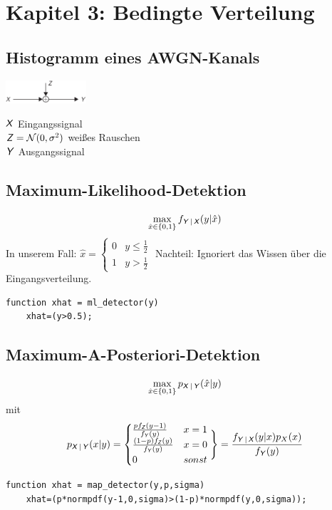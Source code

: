\documentclass[deutsch]{latex4ei/latex4ei_sheet}
\begin{document}
\section{Kapitel 3: Bedingte Verteilung}
\begin{sectionbox}
	\subsection{Histogramm eines AWGN-Kanals}
	\parbox{3.3cm}{
	\includegraphics[width = 3cm]{img/awgn-channel.png}
	}
	\parbox{4cm}{
		$\operatorname{\textsf{\textit{X}}}$ Eingangssignal\\
		$\operatorname{\textsf{\textit{Z}}} = \mathcal N(0, \sigma^2)$ weißes Rauschen\\
		$\operatorname{\textsf{\textit{Y}}}$ Ausgangssignal
		}
	
\end{sectionbox}

\begin{sectionbox}
	\subsection{Maximum-Likelihood-Detektion}
	\[ \max_{\hat x \in \{0,1\}}f_{\operatorname{\textsf{\textit{Y}}}|\operatorname{\textsf{\textit{X}}}}(y|\hat x) \]
	In unserem Fall: $\hat x = \begin{cases}
	0 & y\le \frac{1}{2}\\
	1 & y > \frac{1}{2}
	\end{cases}$
	Nachteil: Ignoriert das Wissen über die Eingangsverteilung.\\
	\begin{lstlisting}[gobble=4]
	function xhat = ml_detector(y)
	xhat=(y>0.5);
	\end{lstlisting}
\end{sectionbox}

\begin{sectionbox}
	\subsection{Maximum-A-Posteriori-Detektion}
	\[\max_{\hat x \in \{0,1\}} p_{\operatorname{\textsf{\textit{X}}}|\operatorname{\textsf{\textit{Y}}}}(\hat x|y)\] mit
	\[p_{\operatorname{\textsf{\textit{X}}}|\operatorname{\textsf{\textit{Y}}}}(x|y)=\begin{cases}
	 \frac{p f_{\operatorname{\textsf{\textit{Z}}}}(y-1)}{f_{\operatorname{\textsf{\textit{Y}}}}(y)} & x=1\\
	\frac{(1-p)f_{\operatorname{\textsf{\textit{Z}}}}(y)}{f_{\operatorname{\textsf{\textit{Y}}}}(y)} & x=0\\
	0 & sonst
	\end{cases} 
	\Bigg\} = \frac{f_{\operatorname{\textsf{\textit{Y}}}|\operatorname{\textsf{\textit{X}}}}(y|x)p_{X}(x)}{f_{\operatorname{\textsf{\textit{Y}}}}(y)}\]
	\begin{lstlisting}[gobble=4]
	function xhat = map_detector(y,p,sigma)
	xhat=(p*normpdf(y-1,0,sigma)>(1-p)*normpdf(y,0,sigma));
	\end{lstlisting}
	\vspace{-7pt}
\end{sectionbox}
\end{document}
